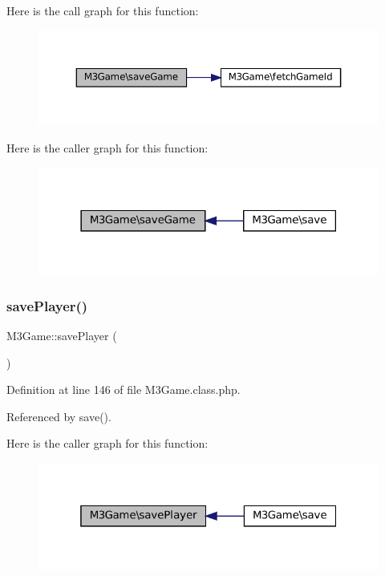 Here is the call graph for this function\+:\nopagebreak
\begin{figure}[H]
\begin{center}
\leavevmode
\includegraphics[width=350pt]{class_m3_game_a1f48931de438241e2b54b40895fafd95_cgraph}
\end{center}
\end{figure}
Here is the caller graph for this function\+:\nopagebreak
\begin{figure}[H]
\begin{center}
\leavevmode
\includegraphics[width=318pt]{class_m3_game_a1f48931de438241e2b54b40895fafd95_icgraph}
\end{center}
\end{figure}
\mbox{\label{class_m3_game_ad8d64fa5c87bbf87f0cdd9930363eae8}} 
\subsubsection{\texorpdfstring{save\+Player()}{savePlayer()}}
{\footnotesize\ttfamily M3\+Game\+::save\+Player (\begin{DoxyParamCaption}{ }\end{DoxyParamCaption})}



Definition at line 146 of file M3\+Game.\+class.\+php.



Referenced by save().

Here is the caller graph for this function\+:\nopagebreak
\begin{figure}[H]
\begin{center}
\leavevmode
\includegraphics[width=319pt]{class_m3_game_ad8d64fa5c87bbf87f0cdd9930363eae8_icgraph}
\end{center}
\end{figure}


